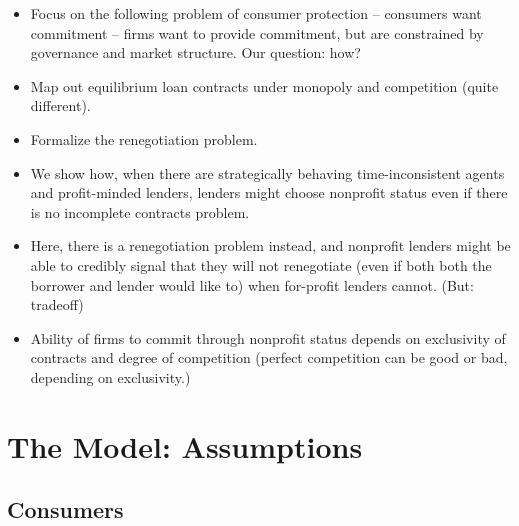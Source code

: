 \documentclass[11pt]{article}%
\begin{document}
\begin{itemize}
\item Focus on the following problem of consumer protection -- consumers want
commitment -- firms want to provide commitment, but are constrained by
governance and market structure. Our question: how?

\item Map out equilibrium loan contracts under monopoly and competition (quite different).

\item Formalize the renegotiation problem.

\item We show how, when there are strategically behaving time-inconsistent
agents and profit-minded lenders, lenders might choose nonprofit status even
if there is no incomplete contracts problem.

\item Here, there is a renegotiation problem instead, and nonprofit lenders
might be able to credibly signal that they will not renegotiate (even if both
both the borrower and lender would like to) when for-profit lenders cannot.
(But: tradeoff)

\item Ability of firms to commit through nonprofit status depends on
exclusivity of contracts and degree of competition (perfect competition can be
good or bad, depending on exclusivity.)
\end{itemize}

\section{The Model: Assumptions}

\subsection{Consumers}
\end{document}
